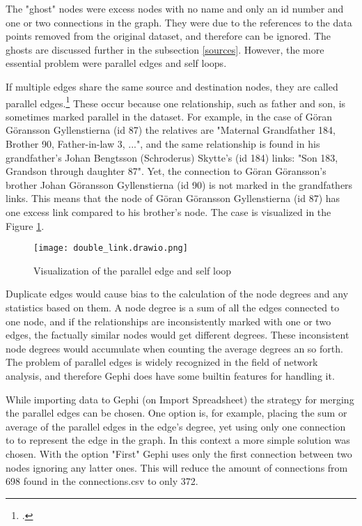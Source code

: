 The "ghost" nodes were excess nodes with no name and only an id number and one or two connections in the graph. They were due to the references to the data points removed from the original dataset, and therefore can be ignored. The ghosts are discussed further in the subsection \ref{sources}. However, the more essential problem were parallel edges and self loops.

If multiple edges share the same source and destination nodes, they are called parallel edges.\footcite[pp. 14-15.]{RajPM2018} These occur because one relationship, such as father and son, is sometimes marked parallel in the dataset. For example, in the case of Göran Göransson Gyllenstierna (id 87) the relatives are "Maternal Grandfather 184, Brother 90, Father-in-law 3, ...", and the same relationship is found in his grandfather's Johan Bengtsson (Schroderus) Skytte's (id 184) links: "Son 183, Grandson through daughter 87". Yet, the connection to Göran Göransson's brother Johan Göransson Gyllenstierna (id 90) is not marked in the grandfathers links. This means that the node of Göran Göransson Gyllenstierna (id 87) has one excess link compared to his brother's node. The case is visualized in the Figure \ref{parallel}.

\begin{figure}
	\texttt{[image: double\_link.drawio.png]}
	\centering
	\caption{Visualization of the parallel edge and self loop} 
	\centering
	\label{parallel}
\end{figure}

Duplicate edges would cause bias to the calculation of the node degrees and any statistics based on them. A node degree is a sum of all the edges connected to one node, and if the relationships are inconsistently marked with one or two edges, the factually similar nodes would get different degrees. These inconsistent node degrees would accumulate when counting the average degrees an so forth. The problem of parallel edges is widely recognized in the field of network analysis, and therefore Gephi does have some builtin features for handling it.

While importing data to Gephi (on Import Spreadsheet) the strategy for merging the parallel edges can be chosen. One option is, for example, placing the sum or average of the parallel edges in the edge's degree, yet using only one connection to to represent the edge in the graph. In this context a more simple solution was chosen. With the option "First" Gephi uses only the first connection between two nodes ignoring any latter ones. This will reduce the amount of connections from 698 found in the connections.csv to only 372.

